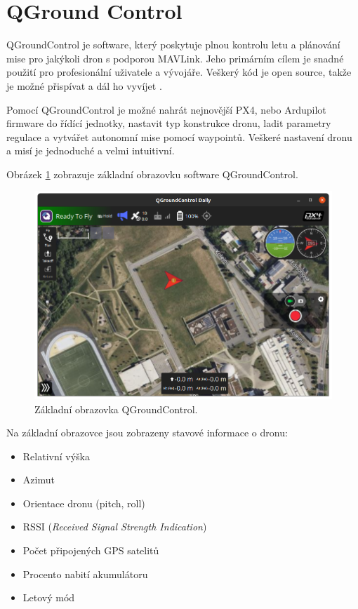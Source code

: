 \section{QGround Control}

QGroundControl je software, který poskytuje plnou kontrolu letu a plánování mise pro jakýkoli dron s podporou MAVLink. Jeho primárním cílem je snadné použití pro profesionální uživatele a vývojáře. Veškerý kód je open source, takže je možné přispívat a dál ho vyvíjet \cite{QGround}.

Pomocí QGroundControl je možné nahrát nejnovější PX4, nebo Ardupilot firmware do řídící jednotky, nastavit typ konstrukce dronu, ladit parametry regulace a vytvářet autonomní mise pomocí waypointů. Veškeré nastavení dronu a misí je jednoduché a velmi intuitivní.

Obrázek \ref{fig:QGC} zobrazuje základní obrazovku software QGroundControl.

\begin{figure}[!ht]
    \begin{center}
        \includegraphics[scale=0.47]{obrazky/QG1}
    \end{center}
    \caption[Základní obrazovka QGroundControl]{Základní obrazovka QGroundControl.}
    \label{fig:QGC}
\end{figure}

Na základní obrazovce jsou zobrazeny stavové informace o dronu:

\begin{itemize}
    \item Relativní výška
    \item Azimut
    \item Orientace dronu (pitch, roll)
    \item RSSI (\textit{Received Signal Strength Indication})
    \item Počet připojených GPS satelitů
    \item Procento nabití akumulátoru
    \item Letový mód
\end{itemize}

